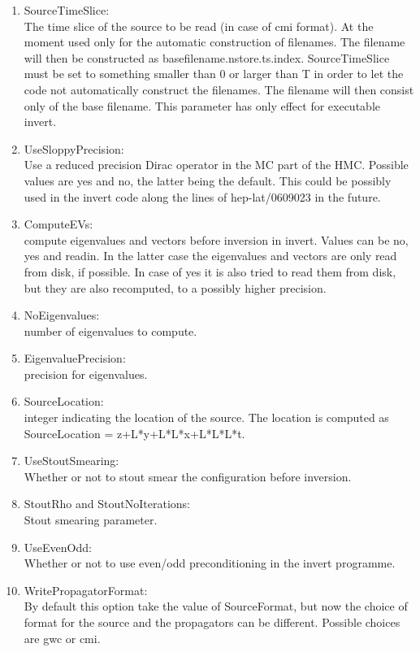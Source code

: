 \begin{enumerate}
\item {\ttfamily SourceTimeSlice}:\\
  The time slice of the source to be read (in case of cmi format). At
  the moment used only for
  the automatic construction of filenames. The filename will then be
  constructed as {\ttfamily basefilename.nstore.ts.index}.
  {\ttfamily SourceTimeSlice} must be set to something
  smaller than 0 or larger than T in order to let the code not
  automatically construct the filenames. The filename will then
  consist only of the base filename. This parameter has only
  effect for executable {\ttfamily invert}.

\item {\ttfamily UseSloppyPrecision}:\\
  Use a reduced precision Dirac operator in the MC part of the
  HMC. Possible values are yes and no, the latter being the
  default. This could be possibly used in the invert code along the 
  lines of {\ttfamily hep-lat/0609023} in the future.

\item {\ttfamily ComputeEVs}:\\
  compute eigenvalues and vectors before inversion in invert. Values
  can be no, yes and readin. In the latter case the eigenvalues and
  vectors are only read from disk, if possible. In case of yes it is
  also tried to read them from disk, but they are also recomputed, to
  a possibly higher precision.

\item {\ttfamily NoEigenvalues}:\\
  number of eigenvalues to compute.

\item {\ttfamily EigenvaluePrecision}:\\
  precision for eigenvalues.

\item {\ttfamily SourceLocation}:\\
  integer indicating the location of the source. The location is computed as
  {\ttfamily SourceLocation = z+L*y+L*L*x+L*L*L*t}.

\item {\ttfamily UseStoutSmearing}:\\
  Whether or not to stout smear the configuration before inversion.

\item {\ttfamily StoutRho} and {\ttfamily StoutNoIterations}:\\
  Stout smearing parameter.

\item {\ttfamily UseEvenOdd}:\\
  Whether or not to use even/odd preconditioning in the invert
  programme.

\item {\ttfamily WritePropagatorFormat}:\\
  By default this option take the value of SourceFormat, but now the choice
  of format for the source and the propagators can be different.
  Possible choices are gwc or cmi.

\end{enumerate}

